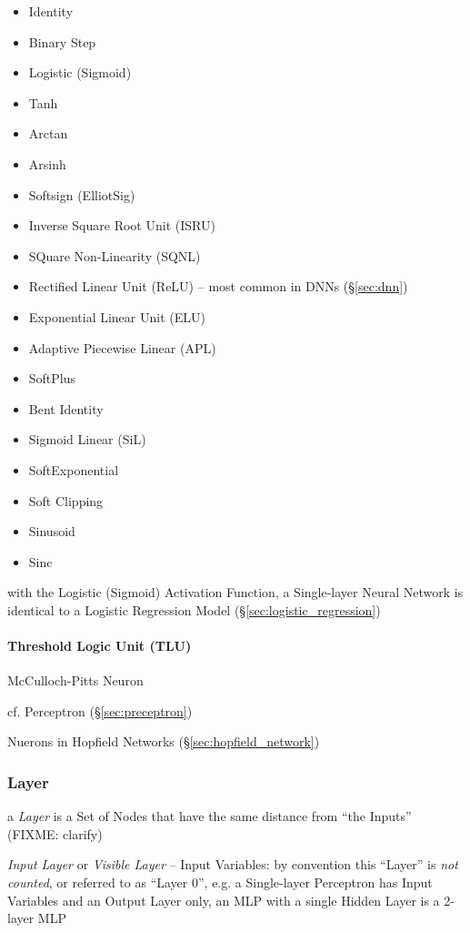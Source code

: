 \begin{itemize}
  \item Identity
  \item Binary Step
  \item Logistic (Sigmoid)
  \item Tanh
  \item Arctan
  \item Arsinh
  \item Softsign (ElliotSig)
  \item Inverse Square Root Unit (ISRU)
  \item SQuare Non-Linearity (SQNL)
  \item Rectified Linear Unit (ReLU) -- most common in DNNs (\S\ref{sec:dnn})
  \item Exponential Linear Unit (ELU)
  \item Adaptive Piecewise Linear (APL)
  \item SoftPlus
  \item Bent Identity
  \item Sigmoid Linear (SiL)
  \item SoftExponential
  \item Soft Clipping
  \item Sinusoid
  \item Sinc
\end{itemize}

with the Logistic (Sigmoid) Activation Function, a Single-layer Neural Network
is identical to a Logistic Regression Model (\S\ref{sec:logistic_regression})



\paragraph{Threshold Logic Unit (TLU)}\label{sec:tlu}\hfill

McCulloch-Pitts Neuron

cf. Perceptron (\S\ref{sec:preceptron})

Nuerons in Hopfield Networks (\S\ref{sec:hopfield_network})



\subsubsection{Layer}\label{sec:ann_layer}

a \emph{Layer} is a Set of Nodes that have the same distance from ``the Inputs''
(FIXME: clarify)

\emph{Input Layer} or \emph{Visible Layer} -- Input Variables: by convention
this ``Layer'' is \emph{not counted}, or referred to as ``Layer $0$'', e.g. a
Single-layer Perceptron has Input Variables and an Output Layer only, an MLP
with a single Hidden Layer is a 2-layer MLP

